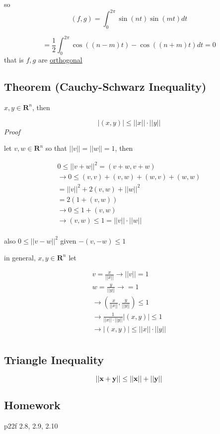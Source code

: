 \documentclass[
  12pt,
]{article}
\begin{document}
so \[(f,g) = \int_0^{2\pi} \sin(nt) \sin(mt) dt\]

\[= \frac{1}{2}\int_0^{2\pi} \cos((n-m)t) - \cos((n+m)t)dt = 0\] that is \(f, g\) are \ul{orthogonal}

\subsection{Theorem (Cauchy-Schwarz Inequality)}\label{theorem-cauchy-schwarz-inequality}

\(x, y \in \mathbf{R}^n\), then

\[|(x, y)| \leq ||x||\cdot ||y||\] \emph{Proof}

let \(v, w \in \mathbf{R}^n\) so that \(||v|| = ||w|| = 1\), then

\[
\begin{aligned}
0 \leq ||v+w||^2 = (v+w, v+w) \\
\rightarrow 0 \leq (v, v) + (v, w) + (w, v) + (w, w) \\
= ||v||^2 + 2(v, w) + ||w||^2 \\
= 2(1 + (v, w)) \\
\rightarrow 0 \leq 1 + (v, w) \\
\rightarrow (v, w) \leq 1 = ||v||\cdot || w|| \\
\end{aligned}
\]

also \(0 \leq ||v-w||^2\) given \(-(v, -w) \leq 1\)

in general, \(x, y \in \mathbf{R}^n\) let

\[
\begin{aligned}
v = \frac{x}{||x||} \rightarrow ||v|| =1 \\
w = \frac{y}{||y||} \rightarrow = 1 \\
\rightarrow \left(\frac{x}{||x||},\frac{y}{||y||}\right) \leq 1 \\
\rightarrow \frac{1}{||x|| \cdot ||y||} |(x, y)| \leq 1 \\
\rightarrow |(x, y)| \leq ||x|| \cdot ||y|| \\
\end{aligned}
\]

\subsection{Triangle Inequality}\label{triangle-inequality}

\newcommand{\boldx}{\mathbf{x}}
\newcommand{\boldy}{\mathbf{y}}

\[
||\mathbf{x} + \mathbf{y}|| \leq ||\mathbf{x}|| + ||\mathbf{y}||
\]

\subsection{Homework}\label{homework}

p22f 2.8, 2.9, 2.10
\end{document}
